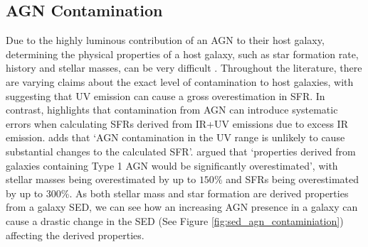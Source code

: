 \subsection{AGN Contamination}
Due to the highly luminous contribution of an AGN to their host galaxy, determining the physical properties of a host galaxy, such as star formation rate, history and stellar masses, can be very difficult \citep{kauffmann_host_2003}. Throughout the literature, there are varying claims about the exact level of contamination to host galaxies, with \cite{salim_uv_2007} suggesting that UV emission can cause a gross overestimation in SFR. In contrast, \cite{cowley_zfourge_2016} highlights that contamination from AGN can introduce systematic errors when calculating SFRs derived from IR+UV emissions due to excess IR emission. \cite{cowley_zfourge_2016} adds that `AGN contamination in the UV range is unlikely to cause substantial changes to the calculated SFR'. \cite{ciesla_constraining_2015} argued that `properties derived from galaxies containing Type 1 AGN would be significantly overestimated', with stellar masses being overestimated by up to $150\%$ and SFRs being overestimated by up to 300\%. As both stellar mass and star formation are derived properties from a galaxy SED, we can see how an increasing AGN presence in a galaxy can cause a drastic change in the SED (See Figure \ref{fig:sed_agn_contaminiation}) affecting the derived properties.
